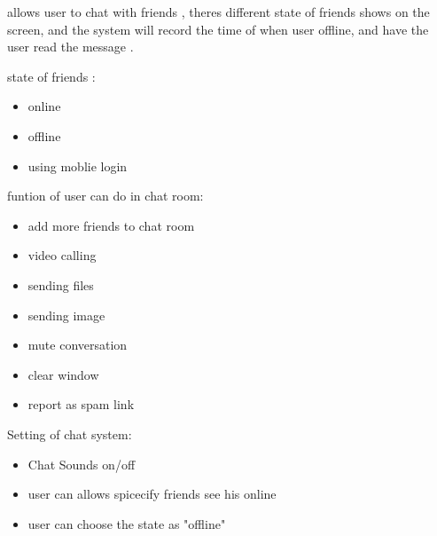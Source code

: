 allows user to chat with friends , theres different state of friends shows on
the screen, and the system will record the time of when user offline, and have
the user read the message .

state of friends :
\begin{itemize}
\item online 
\item offline 
\item using moblie login
\end{itemize}

funtion of user can do in chat room:
\begin{itemize}
\item add more friends to chat room
\item video calling
\item sending files
\item sending image
\item mute conversation 
\item clear window
\item report as spam link
\end{itemize}

Setting of chat system:
\begin{itemize}
\item Chat Sounds {on/off}
\item user can allows spicecify friends see his online
\item user can choose the state as "offline"
\end{itemize}
